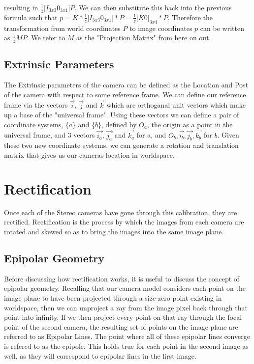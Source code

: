 resulting in $\frac{1}{z}\bigg[ I_{3x3} 0_{3x1} \bigg]P$.  We can then substitute this back into the previous formula such that $p 
= K * \frac{1}{z}\bigg[I_{3x3}0_{3x1}\bigg] * P = \frac{1}{z}\bigg[K0\bigg]_{3x4}*P$.  Therefore the transformation from world 
coordinates $P$ to image coordinates $p$ can be written as $\frac{1}{z}MP$.  We refer to $M$ as the "Projection Matrix" from here 
on out.

\subsection{Extrinsic Parameters}
The Extrinsic parameters of the camera can be defined as the Location and Post of the camera with respect to some reference frame.  We can define our reference frame via the vectors $\vec{i}$, $\vec{j}$ and $\vec{k}$ which are orthoganal unit vectors which make up a base of the "universal frame".  Using these vectors we can define a pair of coordinate systems, $\{a\}$ and $\{b\}$, defined by $O_a$, the origin as a point in the universal frame, and 3 vectors $\vec{i_a}$, $\vec{j_a}$ and $\vec{k_a}$ for a, and $O_b, \vec{i_b}, \vec{j_b}, \vec{k_b}$ for $b$.  Given these two new coordinate systems, we can generate a rotation and translation matrix that gives us our cameras location in worldspace.

\section{Rectification}
Once each of the Stereo cameras have gone through this calibration, they are rectified.  Rectification is the process by which the images from each camera are rotated and skewed so as to bring the images into the same image plane.

\subsection{Epipolar Geometry}
Before discussing how rectification works, it is useful to discuss the concept of epipolar geometry.  Recalling that our camera model considers each point on the image plane to have been projected through a size-zero point existing in worldspace, then we can unproject a ray from the image pixel back through that point into infinity.  If we then project every point on that ray through the focal point of the second camera, the resulting set of points on the image plane are referred to as Epipolar Lines.  The point where all of these epipolar lines converge is refered to as the epipole.  This holds true for each point in the second image as well, as they will correspond to epipolar lines in the first image.


